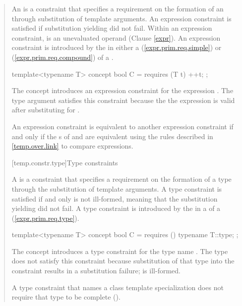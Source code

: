 \begin{quote}
\pnum
An  is a constraint
that specifies a requirement on the formation of an
 
through substitution of template arguments.
% 
An expression constraint is satisfied if substitution 
yielding  did not fail. 
% 
Within an expression constraint,  is an unevaluated 
operand (Clause \ref{expr}).
% 
\enternote
An expression constraint is introduced by the  in 
either a  (\ref{expr.prim.req.simple})
or  (\ref{expr.prim.req.compound})
of a .
\exitnote
% 
\enterexample
\begin{codeblock}
template<typename T> concept bool C = requires (T t) { ++t; };
\end{codeblock}
The concept  introduces an expression constraint for 
the expression .
% 
The type argument  satisfies this constraint because the
the expression  is valid after substituting 
for .
\exitexample

\pnum
An expression constraint  is equivalent to another expression
constraint  if and only if the s of
 and  are equivalent using the rules described 
in \ref{temp.over.link} to compare expressions.


[temp.constr.type]{Type constraints}

\pnum
A  is a constraint that specifies a requirement 
on the formation of a type  through the substitution of template 
arguments.
% 
A type constraint is satisfied if and only  is not ill-formed, meaning 
that the substitution yielding  did not fail.
% 
\enternote
A type constraint is introduced by the  in a
 of a 
(\ref{expr.prim.req.type}).
\exitnote
% 
\enterexample
\begin{codeblock}
template<typename T> concept bool C = requires () { typename T::type; };
\end{codeblock}
The concept  introduces a type constraint for the 
type name .
% 
The type  does not satisfy this constraint
because substitution of that type into the constraint results in a
substitution failure;  is ill-formed.
\exitexample

\pnum
A type constraint that names a class template specialization 
does not require that type to be complete 
().


\end{quote}
